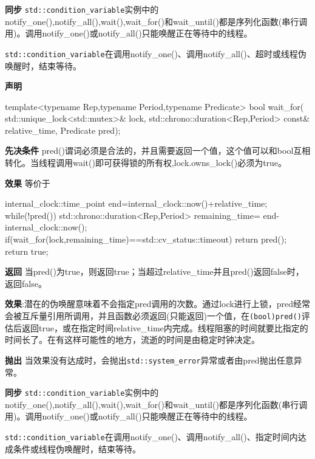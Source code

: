 \textbf{同步}
\texttt{std::condition\_variable}实例中的notify\_one(),notify\_all(),wait(),wait\_for()和wait\_until()都是序列化函数(串行调用)。调用notify\_one()或notify\_all()只能唤醒正在等待中的线程。


\texttt{std::condition\_variable}在调用notify\_one()、调用notify\_all()、超时或线程伪唤醒时，结束等待。

\textbf{声明}

\begin{cpp}
template<typename Rep,typename Period,typename Predicate>
bool wait_for(
    std::unique_lock<std::mutex>& lock,
    std::chrono::duration<Rep,Period> const& relative_time,
    Predicate pred);
\end{cpp}

\textbf{先决条件}
pred()谓词必须是合法的，并且需要返回一个值，这个值可以和bool互相转化。当线程调用wait()即可获得锁的所有权,lock.owns\_lock()必须为true。

\textbf{效果}
等价于

\begin{cpp}
internal_clock::time_point end=internal_clock::now()+relative_time;
while(!pred())
{
  std::chrono::duration<Rep,Period> remaining_time=
      end-internal_clock::now();
  if(wait_for(lock,remaining_time)==std::cv_status::timeout)
      return pred();
}
return true;
\end{cpp}

\textbf{返回}
当pred()为true，则返回true；当超过relative\_time并且pred()返回false时，返回false。

\textbf{效果}:潜在的伪唤醒意味着不会指定pred调用的次数。通过lock进行上锁，pred经常会被互斥量引用所调用，并且函数必须返回(只能返回)一个值，在\texttt{(bool)pred()}评估后返回true，或在指定时间relative\_time内完成。线程阻塞的时间就要比指定的时间长了。在有这样可能性的地方，流逝的时间是由稳定时钟决定。

\textbf{抛出}
当效果没有达成时，会抛出\texttt{std::system\_error}异常或者由pred抛出任意异常。

\textbf{同步}
\texttt{std::condition\_variable}实例中的notify\_one(),notify\_all(),wait(),wait\_for()和wait\_until()都是序列化函数(串行调用)。调用notify\_one()或notify\_all()只能唤醒正在等待中的线程。


\texttt{std::condition\_variable}在调用notify\_one()、调用notify\_all()、指定时间内达成条件或线程伪唤醒时，结束等待。

